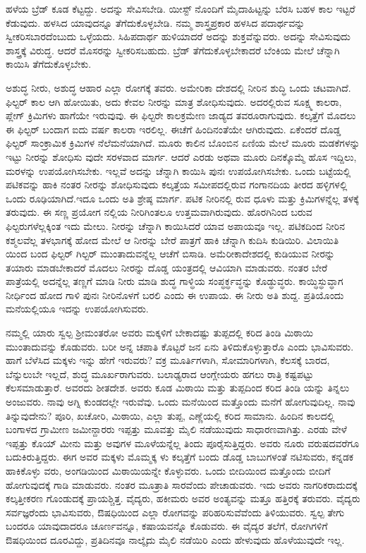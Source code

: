 ಹಳೆಯ ಬ್ರೆಡ್​ ಕೂಡ ಕೆಟ್ಟದ್ದು. ಅದನ್ನು ಸೇವಿಸಬೇಡಿ. ಯೀಸ್ಟ್​ ನೊಂದಿಗೆ ಮೈದಾಹಿಟ್ಟನ್ನು ಬೆರಸಿ ಬಹಳ ಕಾಲ ಇಟ್ಟರೆ ಕೆಡುವುದು. ಹಳಸಿದ ಯಾವುದನ್ನೂ ತೆಗೆದುಕೊಳ್ಳಬೇಡಿ. ನಮ್ಮ ಶಾಸ್ತ್ರಪ್ರಕಾರ ಹಳಸಿದ ಪದಾರ್ಥವನ್ನು ಸ್ವೀಕರಿಸಬಾರದೆಂಬುದು ಒಳ್ಳೆಯದು. ಸಿಹಿಪದಾರ್ಥ ಹುಳಿಯಾದರೆ ಅದನ್ನು ಶುಕ್ತವೆನ್ನುವರು. ಅದನ್ನು ಸೇವಿಸುವುದು ಶಾಸ್ತ್ರಕ್ಕೆ ವಿರುದ್ಧ. ಆದರೆ ಮೊಸರನ್ನು ಸ್ವೀಕರಿಸಬಹುದು. ಬ್ರೆಡ್​ ತೆಗೆದುಕೊಳ್ಳಬೇಕಾದರೆ ಬೆಂಕಿಯ ಮೇಲೆ ಚೆನ್ನಾಗಿ ಕಾಯಿಸಿ ತೆಗೆದುಕೊಳ್ಳಬೇಕು.

ಅಶುದ್ಧ ನೀರು, ಅಶುದ್ಧ ಆಹಾರ ಎಲ್ಲಾ ರೋಗಕ್ಕೆ ತವರು. ಅಮೇರಿಕಾ ದೇಶದಲ್ಲಿ ನೀರಿನ ಶುದ್ಧಿ ಒಂದು ಚಟವಾಗಿದೆ. ಫಿಲ್ಟರ್​ ಕಾಲ ಆಗಿ ಹೋಯಿತು, ಅದು ಕೇವಲ ನೀರನ್ನು ಮಾತ್ರ ಶೋಧಿಸುವುದು. ಅದರಲ್ಲಿರುವ ಸೂಕ್ಷ್ಮ ಕಾಲರಾ, ಪ್ಲೇಗ್​ ಕ್ರಿಮಿಗಳು ಹಾಗೆಯೇ ಇರುವುವು. ಈ ಫಿಲ್ಟರೇ ಕಾಲಕ್ರಮೇಣ ಜಾಡ್ಯದ ತವರೂರಾಗುವುದು. ಕಲ್ಕತ್ತೆಗೆ ಮೊದಲು ಈ ಫಿಲ್ಟರ್​ ಬಂದಾಗ ಐದು ವರ್ಷ ಕಾಲರಾ ಇರಲಿಲ್ಲ. ಈಚೆಗೆ ಹಿಂದಿನಂತೆಯೇ ಆಗಿರುವುದು. ಏಕೆಂದರೆ ದೊಡ್ಡ ಫಿಲ್ಟರ್​ ಸಾಂಕ್ರಾಮಿಕ ಕ್ರಿಮಿಗಳ ನೆಲೆಮನೆಯಾಗಿದೆ. ಮೂರು ಕಾಲಿನ ಬೊಂಬಿನ ಏಣಿಯ ಮೇಲೆ ಮೂರು ಮಡಕೆಗಳನ್ನು ಇಟ್ಟು ನೀರನ್ನು ಶೋಧಿಸು ವುದೇ ಸರಳವಾದ ಮಾರ್ಗ. ಆದರೆ ಎರಡು ಅಥವಾ ಮೂರು ದಿನಕ್ಕೊಮ್ಮೆ ಹೊಸ ಇದ್ದಿಲು, ಮರಳನ್ನು ಉಪಯೋಗಿಸಬೇಕು. ಇಲ್ಲವೆ ಅದನ್ನು ಚೆನ್ನಾಗಿ ಕಾಯಿಸಿ ಪುನಃ ಉಪಯೋಗಿಸಬೇಕು. ಒಂದು ಬಟ್ಟೆಯಲ್ಲಿ ಪಟಿಕವನ್ನು ಹಾಕಿ ನಂತರ ನೀರನ್ನು ಶೋಧಿಸುವುದು ಕಲ್ಕತ್ತೆಯ ಸಮೀಪದಲ್ಲಿರುವ ಗಂಗಾನದಿಯ ತೀರದ ಹಳ್ಳಿಗಳಲ್ಲಿ ಒಂದು ರೂಢಿಯಾಗಿದೆ.ಇದೂ ಒಂದು ಅತಿ ಶ್ರೇಷ್ಠ ಮಾರ್ಗ. ಪಟಿಕ ನೀರಿನಲ್ಲಿ ರುವ ಧೂಳು ಮತ್ತು ಕ್ರಿಮಿಗಳನ್ನೆಲ್ಲ ತಳಕ್ಕೆ ತರುವುದು. ಈ ಸಣ್ಣ ಪ್ರಯೋಗ ನಲ್ಲಿಯ ನೀರಿಗಿಂತಲೂ ಉತ್ತಮವಾಗಿರುವುದು. ಹೊರಗಿನಿಂದ ಬರುವ ಫಿಲ್ಟರುಗಳೆಲ್ಲಕ್ಕಿಂತ ಇದು ಮೇಲು. ನೀರನ್ನು ಚೆನ್ನಾಗಿ ಕಾಯಿಸಿದರೆ ಯಾವ ಅಪಾಯವೂ ಇಲ್ಲ. ಪಟಿಕದಿಂದ ನೀರಿನ ಕಶ್ಮಲವೆಲ್ಲ ತಳಭಾಗಕ್ಕೆ ಹೋದ ಮೇಲೆ ಆ ನೀರನ್ನು ಬೇರೆ ಪಾತ್ರಗೆ ಹಾಕಿ ಚೆನ್ನಾಗಿ ಕುದಿಸಿ ಕುಡಿಯಿರಿ. ವಿಲಾಯಿತಿ ಯಿಂದ ಬಂದ ಫಿಲ್ಟರ್​ ಗಿಲ್ಟರ್​ ಮುಂತಾದುವನ್ನೆಲ್ಲ ಆಚೆಗೆ ಬಿಸಾಡಿ. ಅಮೆರೀಕಾದೇಶದಲ್ಲಿ ಕುಡಿಯುವ ನೀರನ್ನು ತಯಾರು ಮಾಡಬೇಕಾದರೆ ಮೊದಲು ನೀರನ್ನು ದೊಡ್ಡ ಯಂತ್ರದಲ್ಲಿ ಆವಿಯಾಗಿ ಮಾಡುವರು. ನಂತರ ಬೇರೆ ಪಾತ್ರೆಯಲ್ಲಿ ಅದನ್ನೆಲ್ಲ ತಣ್ಣಗೆ ಮಾಡಿ ನೀರು ಮಾಡಿ ಶುದ್ಧ ಗಾಳ್ಧಿಯ ಸಂಪ್ಧರ್ಕ್ಧವ್ಧನ್ನು ಕೊಡ್ಧುವ್ಧರು. ಕಾಯ್ಧಿಸ್ಧುವ್ಧಾಗ ನೀರ್ಧಿಂದ ಹೋದ ಗಾಳಿ ಪುನಃ ನೀರಿನೊಳಗೆ ಬರಲಿ ಎಂದು ಈ ಉಪಾಯ. ಈ ನೀರು ಅತಿ ಶುದ್ದ. ಪ್ರತಿಯೊಂದು ಮನೆಯಲ್ಲಿಯೂ ಇದನ್ನು ಉಪಯೋಗಿಸುವರು.

ನಮ್ಮಲ್ಲಿ ಯಾರು ಸ್ವಲ್ಪ ಶ‍್ರೀಮಂತರೋ ಅವರು ಮಕ್ಕಳಿಗೆ ಬೇಕಾದಷ್ಟು ತುಪ್ಪದಲ್ಲಿ ಕರಿದ ತಿಂಡಿ ಮಿಠಾಯಿ ಮುಂತಾದುವನ್ನು ಕೊಡುವರು. ಬರೀ ಅನ್ನ ಚಪಾತಿ ಕೊಟ್ಟರೆ ಜನ ಏನು ತಿಳಿದುಕೊಳ್ಳುತ್ತಾರೊ ಎಂದು ಭಾವಿಸುವರು. ಹಾಗೆ ಬೆಳೆಸಿದ ಮಕ್ಕಳು ಇನ್ನು ಹೇಗೆ ಇರುವರು? ವಕ್ರ ಮೂರ್ತಿಗಳಾಗಿ, ಸೋಮಾರಿಗಳಾಗಿ, ಕೆಲಸಕ್ಕೆ ಬಾರದ, ಬೆನ್ನುಲುಬೇ ಇಲ್ಲದೆ, ಶುದ್ಧ ಮೂರ್ಖರಾಗುವರು. ಬಲಾಢ್ಯರಾದ ಆಂಗ್ಲೇಯರು ಹಗಲು ರಾತ್ರಿ ಕಷ್ಟಪಟ್ಟು ಕೆಲಸಮಾಡುತ್ತಾರೆ. ಅವರದು ಶೀತದೇಶ. ಅವರು ಕೂಡ ಮಿಠಾಯಿ ಮತ್ತು ತುಪ್ಪದಿಂದ ಕರಿದ ತಿಂಡಿ ಯನ್ನು ತಿನ್ನಲು ಅಂಜುವರು. ನಾವು ಅಗ್ನಿ ಕುಂಡದಲ್ಲೇ ಇರುವೆವು. ಒಂದು ಮನೆಯಿಂದ ಮತ್ತೊಂದು ಮನೆಗೆ ಹೋಗುವುದಿಲ್ಲ. ನಾವು ತಿನ್ನುವುದೇನು? ಪೂರಿ, ಖಚೋರಿ, ಮಿಠಾಯಿ, ಎಲ್ಲಾ ತುಪ್ಪ, ಎಣ್ಣೆಯಲ್ಲಿ ಕರಿದ ಸಾಮಾನು. ಹಿಂದಿನ ಕಾಲದಲ್ಲಿ ಬಂಗಾಳದ ಗ್ರಾಮೀಣ ಜಮೀನ್ದಾರರು ಇಪ್ಪತ್ತು ಮೂವತ್ತು ಮೈಲಿ ನಡೆಯುವುದು ಸಾಧಾರಣವಾಗಿತ್ತು. ಎರಡು ವೇಳೆ ಇಪ್ಪತ್ತು ಕೊಯ್​ ಮೀನು ಮತ್ತು ಅವುಗಳ ಮೂಳೆಯನ್ನೆಲ್ಲ ತಿಂದು ಪೂರೈಸುತ್ತಿದ್ದರು. ಅವರು ನೂರು ವರುಷದವರೆಗೂ ಬದುಕಿರುತ್ತಿದ್ದರು. ಈಗ ಅವರ ಮಕ್ಕಳು ಮೊಮ್ಮಕ್ಕ ಳು ಕಲ್ಕತ್ತೆಗೆ ಬಂದು ಡೊಡ್ಡ ಬಾಬುಗಳಂತೆ ನಟಿಸುವರು, ಕನ್ನಡಕ ಹಾಕಿಕೊಳ್ಳು ವರು, ಅಂಗಡಿಯಿಂದ ಮಿಠಾಯಿಯನ್ನೇ ಕೊಳ್ಳುವರು. ಒಂದು ಬೀದಿಯಿಂದ ಮತ್ತೊಂದು ಬೀದಿಗೆ ಹೋಗುವುದಕ್ಕೆ ಗಾಡಿ ಮಾಡುವರು. ನಂತರ ಮೂತ್ರಾತಿ ಸಾರವೆಂದು ಪೇಚಾಡುವರು. ಇದು ಅವರು ನಾಗರಿಕರಾದುದಕ್ಕೆ ಕಲ್ಕತ್ತೀಕರಣ ಗೊಂಡುದಕ್ಕೆ ಪ್ರಾಯಶ್ಚಿತ್ತ. ವೈದ್ಯರು, ಹಕೀಮರು ಅವರ ಅಂತ್ಯವನ್ನು ಮತ್ತೂ ಹತ್ತಿರಕ್ಕೆ ತರುವರು. ವೈದ್ಯರು ಸರ್ವಜ್ಞರೆಂದು ಭಾವಿಸುವರು, ಔಷಧಿಯಿಂದ ಎಲ್ಲಾ ರೋಗವನ್ನು ಪರಿಹರಿಸುವೆವೆಂದು ತಿಳಿಯುವರು. ಸ್ವಲ್ಪ ತೇಗು ಬಂದರೂ ಯಾವುದಾದರೂ ಚೂರ್ಣವನ್ನೂ, ಕಷಾಯವನ್ನೊ ಕೊಡುವರು. ಈ ವೈದ್ಯರ ತಲೆಗೆ, ರೋಗಿಗಳಿಗೆ ಔಷಧಿಯಿಂದ ದೂರವಿದ್ದು, ಪ್ರತಿದಿನವೂ ನಾಲ್ಕೈದು ಮೈಲಿ ನಡೆಯಿರಿ ಎಂದು ಹೇಳುವುದು ಹೊಳೆಯುವುದೇ ಇಲ್ಲ.

